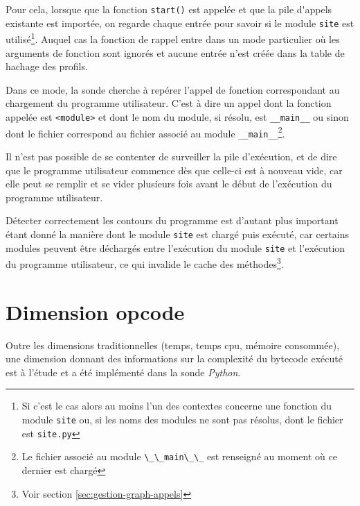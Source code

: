 Pour cela, lorsque que la fonction \verb|start()| est appelée et que la \gls{pile d'appels} existante est importée, on regarde chaque entrée pour savoir si le module \verb|site| est utilisé\footnote{Si c'est le cas alors au moins l'un des contextes concerne une fonction du module \verb?site? ou, si les noms des modules ne sont pas résolus, dont le fichier est \verb?site.py?}. Auquel cas la fonction de rappel entre dans un mode particulier où les arguments de fonction sont ignorés et aucune entrée n'est créée dans la table de hachage des profils.

Dans ce mode, la sonde cherche à repérer l'appel de fonction correspondant au chargement du programme utilisateur. C'est à dire un appel dont la fonction appelée est \verb|<module>| et dont le nom du module, si résolu, est \verb|__main__| ou sinon dont le fichier correspond au fichier associé au module \verb|__main__|\footnote{Le fichier associé au module \verb?\_\_main\_\_? est renseigné au moment où ce dernier est chargé}.

\begin{note}
Il n'est pas possible de se contenter de surveiller la pile d'exécution, et de dire que le programme utilisateur commence dès que celle-ci est à nouveau vide, car elle peut se remplir et se vider plusieurs fois avant le début de l'exécution du programme utilisateur.
\end{note}

\begin{note}
Détecter correctement les contours du programme est d'autant plus important étant donné la manière dont le module \verb|site| est chargé puis exécuté, car certains modules peuvent être déchargés entre l'exécution du module \verb|site| et l'exécution du programme utilisateur, ce qui invalide le cache des méthodes\footnote{Voir section \vref{sec:gestion-graph-appels}}.
\end{note}

  \section{Dimension opcode}
    
Outre les dimensions traditionnelles (temps, temps cpu, mémoire consommée), une dimension donnant des informations sur la complexité du \gls{bytecode} exécuté est à l'étude et a été implémenté dans la sonde \emph{Python}.

